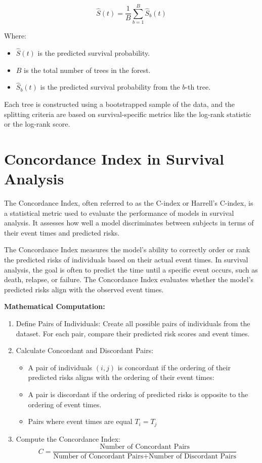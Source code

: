 \documentclass[12pt]{report}
\begin{document}
\[
\hat{S}(t) = \frac{1}{B} \sum_{b=1}^B \hat{S}_b(t)
\]

Where:
\begin{itemize}
    \item \( \hat{S}(t) \) is the predicted survival probability.
    \item \( B \) is the total number of trees in the forest.
    \item \( \hat{S}_b(t) \) is the predicted survival probability from the \( b \)-th tree.
\end{itemize}

Each tree is constructed using a bootstrapped sample of the data, and the splitting criteria are based on survival-specific metrics like the log-rank statistic or the log-rank score.

\section{Concordance Index in Survival Analysis}
The Concordance Index, often referred to as the C-index or Harrell's C-index, is a statistical metric used to evaluate the performance of models in survival analysis. It assesses how well a model discriminates between subjects in terms of their event times and predicted risks.

The Concordance Index measures the model's ability to correctly order or rank the predicted risks of individuals based on their actual event times. In survival analysis, the goal is often to predict the time until a specific event occurs, such as death, relapse, or failure. The Concordance Index evaluates whether the model's predicted risks align with the observed event times.

\textbf{Mathematical Computation:}
\begin{enumerate}
    \item Define Pairs of Individuals: Create all possible pairs of individuals from the dataset. For each pair, compare their predicted risk scores and event times.
    \item Calculate Concordant and Discordant Pairs:
    \begin{itemize}
        \item A pair of individuals \( (i, j) \) is concordant if the ordering of their predicted risks aligns with the ordering of their event times:
        \item A pair is discordant if the ordering of predicted risks is opposite to the ordering of event times.
        \item Pairs where event times are equal \( T_i = T_j \)
    \end{itemize}
    \item Compute the Concordance Index:
    \[
    C = \frac{\text{Number of Concordant Pairs}}{\text{Number of Concordant Pairs} + \text{Number of Discordant Pairs}}
    \]
\end{enumerate}
\end{document}
